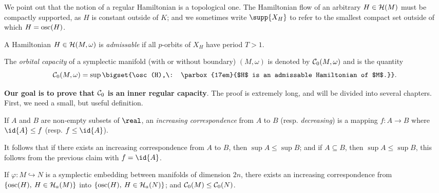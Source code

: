 \documentclass[../main-v2-manifolds.tex]{subfiles}
\begin{document}
We point out that the notion of a regular Hamiltonian is a topological one. The Hamiltonian flow of an arbitrary $H\in\mathcal{H}(M)$ must be compactly supported, as $H$ is constant outside of $K$; and we sometimes write $\supp{X_H}$ to refer to the smallest compact set outside of which $H = \mathrm{osc}(H)$.
\begin{definition}\label{def:admissable hamiltonians}
    A Hamiltonian $H\in \mathcal{H}(M,\omega)$ is \emph{admissable} if all $p$-orbits of $X_H$ have period $T > 1$.
\end{definition}
\begin{definition}
    The \emph{orbital capacity} of a symplectic manifold (with or without boundary) $(M,\omega)$ is denoted by $\mathcal{C}_0(M,\omega)$ and is the quantity
    \[
        \frakc_0(M,\omega) = \sup\bigset{\osc(H),\: \parbox{17em}{$H$ is an admissable Hamiltonian of $M$.}}.
    \]
\end{definition}
\textbf{Our goal is to prove that $\mathcal{C}_0$ is an inner regular capacity}. The proof is extremely long, and will be divided into several chapters. First, we need a small, but useful definition.
\begin{definition}
    If $A$ and $B$ are non-empty subsets of $\real$, an \emph{increasing correspondence} from $A$ to $B$ (resp. \emph{decreasing}) is a mapping $f: A\to B$ where $\id{A}\leq f$ (resp. $f\leq \id{A}$).
\end{definition}
It follows that if there exists an increasing correspondence from $A$ to $B$, then $\sup A\leq \sup B$; and if $A\subseteq B$, then $\sup A\leq \sup B$, this follows from the previous claim with $f =\id{A}$.
\begin{wts}\label{thm:monotonicity of frakco}
    If $\varphi: M\hookrightarrow N$ is a symplectic embedding between manifolds of dimension $2n$, there exists an increasing correspondence from $\{\mathrm{osc}(H),\: H\in\mathcal{H}_a(M)\}$ into $\{\mathrm{osc}(H),\: H\in\mathcal{H}_a(N)\}$; and $\mathcal{C}_0(M)\leq \mathcal{C}_0(N)$.
\end{wts}
\end{document}
